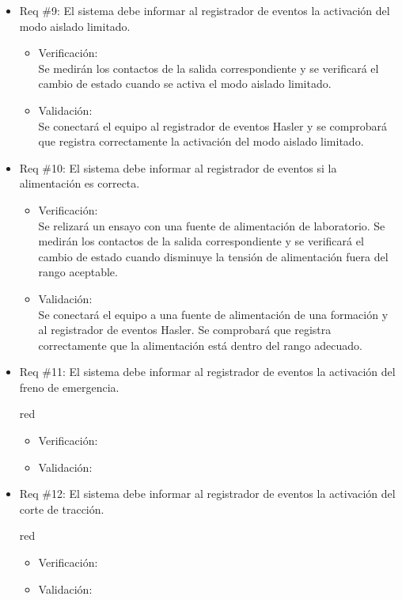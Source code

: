 \documentclass[11pt]{charter}
\begin{document}
\begin{itemize}
\item Req \#9: El sistema debe informar al registrador de eventos la activación del modo aislado limitado.
\begin{itemize}
  \item Verificación:\\
  Se medirán los contactos de la salida correspondiente y se verificará el cambio de estado cuando se activa el modo aislado limitado.
  \item Validación:\\
  Se conectará el equipo al registrador de eventos Hasler y se comprobará que registra correctamente la activación del modo aislado limitado.
\end{itemize}

\item Req \#10: El sistema debe informar al registrador de eventos si la alimentación es correcta.
\begin{itemize}
  \item Verificación:\\
  Se relizará un ensayo con una fuente de alimentación de laboratorio.
  Se medirán los contactos de la salida correspondiente y se verificará el cambio de estado cuando disminuye la tensión de alimentación fuera del rango aceptable.
  \item Validación:\\
  Se conectará el equipo a una fuente de alimentación de una formación y al registrador de eventos Hasler.
  Se comprobará que registra correctamente que la alimentación está dentro del rango adecuado.
\end{itemize}

\item Req \#11: El sistema debe informar al registrador de eventos la activación del freno de emergencia.
\begin{consigna}{red}
\begin{itemize}
  \item Verificación:\\
  \item Validación:\\
\end{itemize}
\end{consigna}

\item Req \#12: El sistema debe informar al registrador de eventos la activación del corte de tracción.
\begin{consigna}{red}
\begin{itemize}
  \item Verificación:\\
  \item Validación:\\
\end{itemize}
\end{consigna}


\end{itemize}
\end{document}
